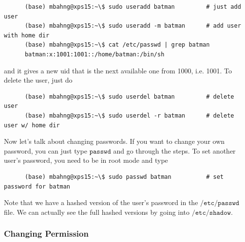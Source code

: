\documentclass{article}
\begin{document}
      \begin{lstlisting}
      (base) mbahng@xps15:~\$ sudo useradd batman         # just add user 
      (base) mbahng@xps15:~\$ sudo useradd -m batman      # add user with home dir 
      (base) mbahng@xps15:~\$ cat /etc/passwd | grep batman
      batman:x:1001:1001::/home/batman:/bin/sh
      \end{lstlisting}
      and it gives a new uid that is the next available one from 1000, i.e. 1001. To delete the user, just do 
      \begin{lstlisting}
      (base) mbahng@xps15:~\$ sudo userdel batman         # delete user
      (base) mbahng@xps15:~\$ sudo userdel -r batman      # delete user w/ home dir
      \end{lstlisting}
      Now let's talk about changing passwords. If you want to change your own password, you can just type $\texttt{passwd}$ and go through the steps. To set another user's password, you need to be in root mode and type 
      \begin{lstlisting}
      (base) mbahng@xps15:~\$ sudo passwd batman          # set password for batman
      \end{lstlisting}

      Note that we have a hashed version of the user's password in the $\texttt{/etc/passwd}$ file. We can actually see the full hashed versions by going into $\texttt{/etc/shadow}$. 

    \subsubsection{Changing Permission}
\end{document}
